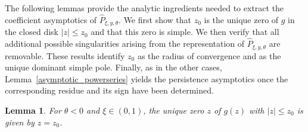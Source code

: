 \documentclass[12pt]{article}
\newcommand{\1}{\mathds{1}}
\theoremstyle{definition}
\theoremstyle{plain}
\newtheorem{Lemma}[definition]{Lemma}
\theoremstyle{remark}
\begin{document}
The following lemmas provide the analytic ingredients needed to extract the coefficient asymptotics of $\hat{P}_{\xi,y,\theta}$. We first show that $z_0$ is the unique zero of $g$ in the closed disk $|z|\leq z_0$ and that this zero is simple. We then verify that all additional possible singularities arising from the representation of $\hat{P}_{\xi,y,\theta}$ are removable. These results identify $z_0$ as the radius of convergence and as the unique dominant simple pole. Finally, as in the other cases, Lemma~\ref{asymptotic_powerseries} yields the
persistence asymptotics once the corresponding residue and its
sign have been determined.
\begin{Lemma}\label{zeros_g_neg_theta}
    For $\theta<0$ and $\xi\in(0,1)$, the unique zero $z$ of $g(z)$ with $|z|\le z_0$ is given by $z=z_0$. 
\end{Lemma}
\end{document}
